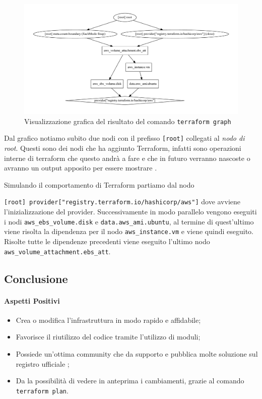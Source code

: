 \documentclass[12pt, a4paper, titlepage]{article}
\begin{document}
\begin{figure}[ht!]
	\centering
	\includegraphics[width=160mm]{./img/graph.pdf}
	\caption{Visualizzazione grafica del risultato del comando \texttt{terraform graph}}
	\label{fig:graph}
\end{figure}

Dal grafico notiamo subito due nodi con il prefisso \texttt{[root]} collegati al \textit{nodo di root}. Questi sono dei nodi che ha aggiunto Terraform, infatti sono operazioni interne di terraform che questo andrà a fare e che in futuro verranno nascoste o avranno un output apposito per essere mostrare \cite{github_issue_14511}.

Simulando il comportamento di Terraform partiamo dal nodo

\texttt{[root] provider["registry.terraform.io/hashicorp/aws"]} dove avviene l'inizializzazione del provider. Successivamente in modo parallelo vengono eseguiti i nodi \texttt{aws\_ebs\_volume.disk} e \texttt{data.aws\_ami.ubuntu}, al termine di quest'ultimo viene risolta la dipendenza per il nodo \texttt{aws\_instance.vm} e viene quindi eseguito.
Risolte tutte le dipendenze precedenti viene eseguito l'ultimo nodo \texttt{aws\_volume\_attachment.ebs\_att}. 

\clearpage
\subsection{Conclusione}

\paragraph{Aspetti Positivi}
\begin{itemize}
	\item Crea o modifica l'infrastruttura in modo rapido e affidabile;
	\item Favorisce il riutilizzo del codice tramite l'utilizzo di moduli;
	\item Possiede un'ottima community che da supporto e pubblica molte soluzione sul registro ufficiale \cite{terraform_registry}; 
	\item Da la possibilità di vedere in anteprima i cambiamenti, grazie al comando \texttt{terraform plan}.
\end{itemize}
 
\end{document}
